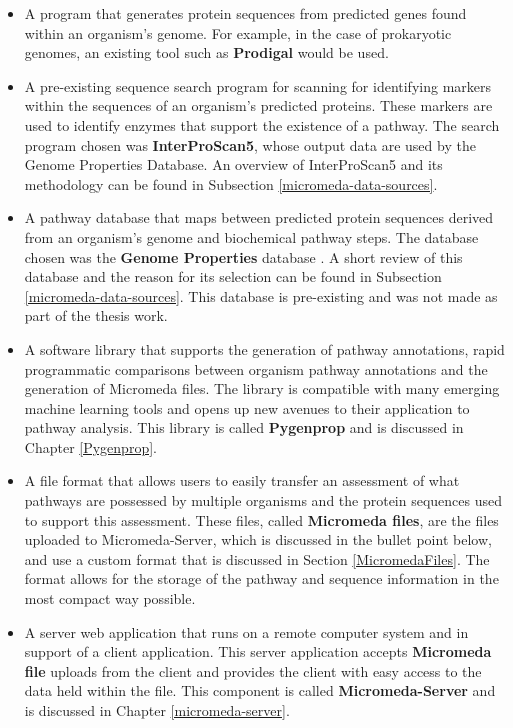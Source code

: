 \FloatBarrier
\begin{itemize}
\item A program that generates protein sequences from predicted genes found 
within an organism's genome. For example, in the case of prokaryotic genomes, an 
existing tool such as \textbf{Prodigal} \cite{hyatt2010prodigal} would be used. 

\item A pre-existing sequence search program for scanning for identifying 
markers within the sequences of an organism's predicted proteins. These markers 
are used to identify enzymes that support the existence of a pathway. The search 
program chosen was \textbf{InterProScan5}, whose output data are used by the 
Genome Properties Database. An overview of InterProScan5 
\cite{jones2014interproscan} and its methodology can be found in Subsection 
\ref{micromeda-data-sources}.

\item A pathway database that maps between predicted protein sequences derived 
from an organism's genome and biochemical pathway steps. The database chosen was 
the \textbf{Genome Properties} database \cite{richardson2018genome}. A short 
review of this database and the reason for its selection can be found in 
Subsection \ref{micromeda-data-sources}. This database is pre-existing 
and was not made as part of the thesis work.

\item A software library that supports the generation of pathway annotations, 
rapid programmatic comparisons between organism pathway annotations and the 
generation of Micromeda files. The library is compatible with many 
emerging machine learning tools and opens up new avenues to their application to 
pathway analysis. This library is called \textbf{Pygenprop} and is discussed in 
Chapter \ref{Pygenprop}.

\item A file format that allows users to easily transfer an assessment of what 
pathways are possessed by multiple organisms and the protein sequences used to 
support this assessment. These files, called \textbf{Micromeda files}, are the 
files uploaded to Micromeda-Server, which is discussed in the bullet point below, 
and use a custom format that is discussed in Section \ref{MicromedaFiles}. The 
format allows for the storage of the pathway and sequence information in the 
most compact way possible.

\item A server web application that runs on a remote computer system and in 
support of a client application. This server application accepts 
\textbf{Micromeda file} uploads from the client and provides the client with 
easy access to the data held within the file. This component is called 
\textbf{Micromeda-Server} and is discussed in Chapter \ref{micromeda-server}.


\end{itemize}
